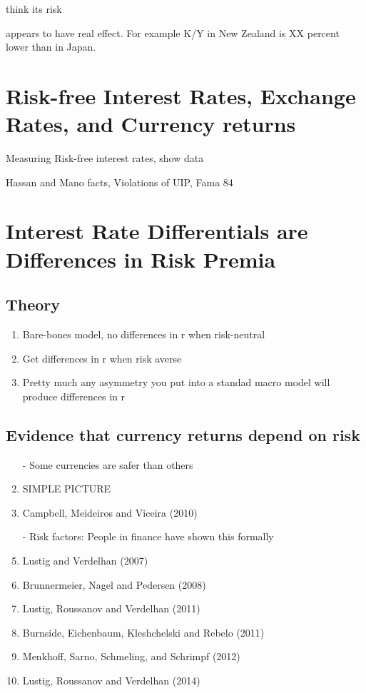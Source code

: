 \documentclass[12pt,letter]{article}
\theoremstyle{break} \theorembodyfont{\normalfont\itshape}
\theoremstyle{break}
\theoremstyle{break} \theorembodyfont{\normalfont\itshape}
\theoremstyle{break} \theorembodyfont{\normalfont\itshape}
\begin{document}
think its risk

appears to have real effect. For example K/Y in New Zealand is XX percent lower than in Japan.


\section{Risk-free Interest Rates, Exchange Rates, and Currency returns}

Measuring Risk-free interest rates, show data

Hassan and Mano facts, Violations of UIP, Fama 84

\section{Interest Rate Differentials are Differences in Risk Premia}
\subsection{Theory}
\begin{enumerate}
    \item Bare-bones model, no differences in r when risk-neutral
    \item Get differences in r when risk averse
    \item Pretty much any asymmetry you put into a standad macro model will produce differences in r
\end{enumerate}

\subsection{Evidence that currency returns depend on risk}
\begin{enumerate}
\item[-] Some currencies are safer than others
\item SIMPLE PICTURE
\item Campbell, Meideiros and Viceira (2010)
\item[-] Risk factors: People in finance have shown this formally
\item Lustig and Verdelhan (2007)
\item Brunnermeier, Nagel and Pedersen (2008)
\item Lustig, Roussanov and Verdelhan (2011)
\item Burnside, Eichenbaum, Kleshchelski and Rebelo (2011)
\item Menkhoff, Sarno, Schmeling, and Schrimpf (2012)
\item Lustig, Roussanov and Verdelhan (2014)
\end{enumerate}
\end{document}
